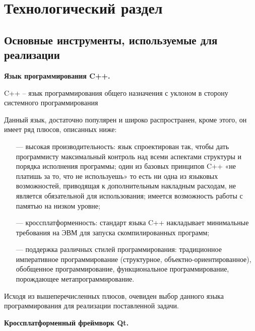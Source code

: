 \chapter{Технологический раздел}
\label{cha:impl}


\section{Основные инструменты, используемые для реализации}

\noindent\textbf{Язык программирования C++.}

C++ -- язык программирования общего назначения с уклоном в сторону системного программирования \cite{Cpp}

Данный язык, достаточно популярен и широко распространен, кроме этого, он имеет ряд плюсов, описанных ниже:

\begin{itemize}
	\item[---] высокая производительность: язык спроектирован так, чтобы дать программисту максимальный контроль над всеми аспектами структуры и порядка исполнения программы; один из базовых принципов C++ «не платишь за то, что не используешь» то есть ни одна из языковых возможностей, приводящая к дополнительным накладным расходам, не является обязательной для использования; имеется возможность работы с памятью на низком уровне;
	\item[---] кроссплатформенность: стандарт языка C++ накладывает минимальные требования на ЭВМ для запуска скомпилированных программ;
	\item[---] поддержка различных стилей программирования: традиционное императивное программирование (структурное, объектно-ориентированное), обобщенное программирование, функциональное программирование, порождающее метапрограммирование.
\end{itemize}

Исходя из вышеперечисленных плюсов, очевиден выбор данного языка программирования для реализации поставленной задачи. %

\noindent\textbf{Кроссплатформенный фреймворк Qt.}


